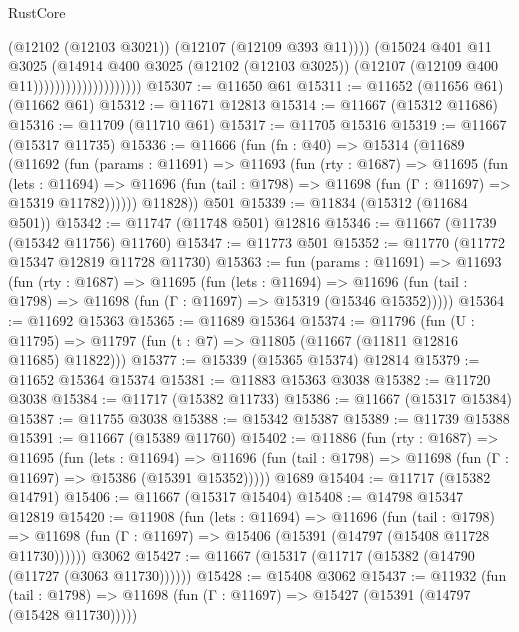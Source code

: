 \begin{lexlean}{RustCore}
\begin{coremodule}
                                        (@12102 (@12103 @3021))
                                        (@12107 (@12109 @393 @11))))
                                    (@15024
                                      @401
                                      @11
                                      @3025
                                      (@14914
                                        @400
                                        @3025
                                        (@12102 (@12103 @3025))
                                        (@12107 (@12109 @400 @11))))))))))))))))))))
@15307 := @11650 @61
@15311 := @11652 (@11656 @61) (@11662 @61)
@15312 := @11671 @12813
@15314 := @11667 (@15312 @11686)
@15316 := @11709 (@11710 @61)
@15317 := @11705 @15316
@15319 := @11667 (@15317 @11735)
@15336 := @11666
    (fun (fn : @40) =>
    @15314
      (@11689
        (@11692
          (fun (params : @11691) =>
          @11693
            (fun (rty : @1687) =>
            @11695
              (fun (lets : @11694) =>
              @11696 (fun (tail : @1798) => @11698 (fun (Γ : @11697) => @15319 @11782))))))
        @11828))
    @501
@15339 := @11834 (@15312 (@11684 @501))
@15342 := @11747 (@11748 @501) @12816
@15346 := @11667 (@11739 (@15342 @11756) @11760)
@15347 := @11773 @501
@15352 := @11770 (@11772 @15347 @12819 @11728 @11730)
@15363 := fun (params : @11691) =>
  @11693
    (fun (rty : @1687) =>
    @11695
      (fun (lets : @11694) =>
      @11696 (fun (tail : @1798) => @11698 (fun (Γ : @11697) => @15319 (@15346 @15352)))))
@15364 := @11692 @15363
@15365 := @11689 @15364
@15374 := @11796
    (fun (U : @11795) => @11797 (fun (t : @7) => @11805 (@11667 (@11811 @12816 @11685) @11822)))
@15377 := @15339 (@15365 @15374) @12814
@15379 := @11652 @15364 @15374
@15381 := @11883 @15363 @3038
@15382 := @11720 @3038
@15384 := @11717 (@15382 @11733)
@15386 := @11667 (@15317 @15384)
@15387 := @11755 @3038
@15388 := @15342 @15387
@15389 := @11739 @15388
@15391 := @11667 (@15389 @11760)
@15402 := @11886
    (fun (rty : @1687) =>
    @11695
      (fun (lets : @11694) =>
      @11696 (fun (tail : @1798) => @11698 (fun (Γ : @11697) => @15386 (@15391 @15352)))))
    @1689
@15404 := @11717 (@15382 @14791)
@15406 := @11667 (@15317 @15404)
@15408 := @14798 @15347 @12819
@15420 := @11908
    (fun (lets : @11694) =>
    @11696
      (fun (tail : @1798) =>
      @11698 (fun (Γ : @11697) => @15406 (@15391 (@14797 (@15408 @11728 @11730))))))
    @3062
@15427 := @11667 (@15317 (@11717 (@15382 (@14790 (@11727 (@3063 @11730))))))
@15428 := @15408 @3062
@15437 := @11932
    (fun (tail : @1798) => @11698 (fun (Γ : @11697) => @15427 (@15391 (@14797 (@15428 @11730)))))

\end{coremodule}
\end{lexlean}
